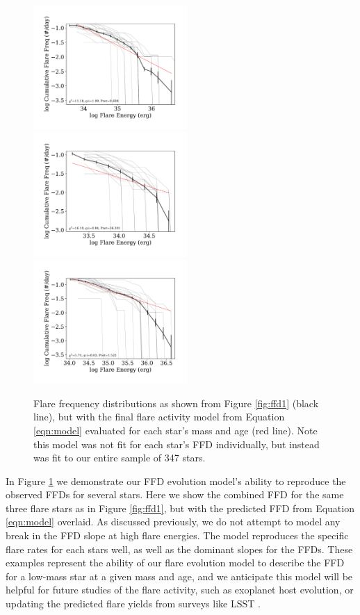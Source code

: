 \documentclass[preprint2]{aastex62}
\begin{document}
\begin{figure}[!t]
\centering
\includegraphics[width=2.3in]{fig9a}
\includegraphics[width=2.3in]{fig9b}
\includegraphics[width=2.3in]{fig9c}
\caption{
Flare frequency distributions as shown from Figure \ref{fig:ffd1} (black line), but with the final flare activity model from Equation \ref{eqn:model} evaluated for each star's mass and age (red line). Note this model was not fit for each star's FFD individually, but instead was fit to our entire sample of 347 stars.}
\label{fig:ffdmodel}
\end{figure}



In Figure \ref{fig:ffdmodel} we demonstrate our FFD evolution model's ability to reproduce the observed FFDs for several stars. Here we show the combined FFD for the same three flare stars as in Figure \ref{fig:ffd1}, but with the predicted FFD from Equation \ref{eqn:model} overlaid. As discussed previously, we do not attempt to model any break in the FFD slope at high flare energies. The model reproduces the specific flare rates for each stars well, as well as the dominant slopes for the FFDs. These examples represent the ability of our flare evolution model to describe the FFD for a low-mass star at a given mass and age, and we anticipate this model will be helpful for future studies of the flare activity, such as exoplanet host evolution, or updating the predicted flare yields from surveys like LSST \citep{najita2016}.
\end{document}
